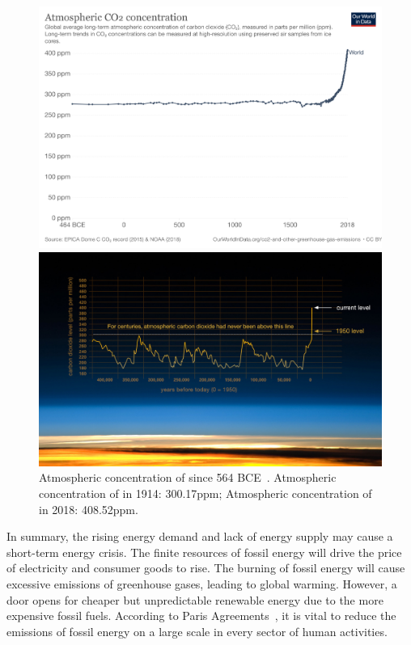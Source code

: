 \begin{figure}
\center
\includegraphics[scale=0.12]{img/intro_co2-concentration-long-term.png}
\caption{Atmospheric concentration of  since 564 BCE~\cite{bereiter2015revision}. Atmospheric concentration of  in 1914: 300.17ppm; Atmospheric concentration of  in 2018: 408.52ppm.}
\label{intro_co2-concentration-long-term}
\includegraphics[scale=0.33]{img/intro_nasa_co2.jpeg}
\end{figure}


In summary, the rising energy demand and lack of energy supply may cause a short-term energy crisis. The finite resources of fossil energy will drive the price of electricity and consumer goods to rise. The burning of fossil energy will cause excessive emissions of greenhouse gases, leading to global warming. However, a door opens for cheaper but unpredictable renewable energy due to the more expensive fossil fuels. According to Paris Agreements~\cite{unies2015accord}, it is vital to reduce the emissions of fossil energy on a large scale in every sector of human activities.\\

